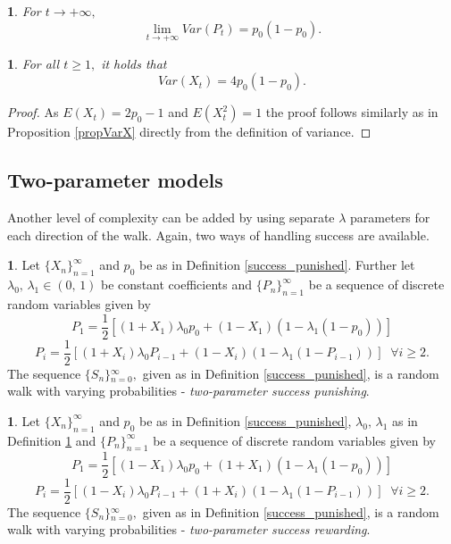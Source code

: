 \documentclass{amsart}
\theoremstyle{definition}
\newtheorem{defn}[thm]{\protect\definitionname}
\theoremstyle{plain}
\newtheorem{prop}[thm]{\protect\propositionname}
\theoremstyle{plain}
\newtheorem{cor}[thm]{\protect\corollaryname}
\theoremstyle{plain}
\numberwithin{equation}{section}
\providecommand{\corollaryname}{Corollary}
\providecommand{\definitionname}{Definition}
\providecommand{\propositionname}{Proposition}
\begin{document}
    \begin{cor}
        For $t\rightarrow+\infty,$ \textup{
            \[
                \lim_{t\to+\infty}Var(P_{t})=p_{0}(1-p_{0}).
            \]
        }
    \end{cor}

    \begin{prop}
        For all $t\geq1,$ it holds that
        \[
            Var(X_{t})=4p_0(1-p_0).
        \]
    \end{prop}
    \begin{proof}
        As $E(X_t)=2p_0-1$ and $E(X_t^2)=1$ the proof follows similarly as in Proposition \ref{propVarX} directly from the definition of variance.
    \end{proof}

    \subsection{Two-parameter models}

    Another level of complexity can be added by using separate $\lambda$
    parameters for each direction of the walk. Again, two ways of handling
    success are available.

    \begin{defn}
        \label{2lambdas}Let ${\{X_{n}\}}_{n=1}^{\infty}$ and $p_{0}$ be
        as in Definition \ref{success_punished}. Further let $\lambda_{0},\,\lambda_{1}\in(0,\,1)$
        be constant coefficients and ${\{P_{n}\}}_{n=1}^{\infty}$ be a sequence
        of discrete random variables given by
        \begin{equation}
            P_{1}=\frac{1}{2}[(1+X_{1})\lambda_{0}p_{0}+(1-X_{1})(1-\lambda_{1}(1-p_{0}))]\label{eq:P!1_def-1-1}
        \end{equation}
        \begin{equation}
            P_{i}=\frac{1}{2}[(1+X_{i})\lambda_{0}P_{i-1}+(1-X_{i})(1-\lambda_{1}(1-P_{i-1}))]\;\;\forall i\geq2.\label{eq:Pi_def-1-1}
        \end{equation}
        The sequence ${\{S_{n}\}}{}_{n=0}^{\infty},$ given as in Definition \ref{success_punished}, is a random walk with varying probabilities - \emph{two-parameter success
        punishing}.
    \end{defn}


    \begin{defn}
        \label{2lambdas-reward}Let ${\{X_{n}\}}_{n=1}^{\infty}$ and $p_{0}$
        be as in Definition \ref{success_punished}, $\lambda_{0},\,\lambda_{1}$
        as in Definition \ref{2lambdas} and ${\{P_{n}\}}_{n=1}^{\infty}$ be a sequence
        of discrete random variables given by
        \[
            P_{1}=\frac{1}{2}[(1-X_{1})\lambda_{0}p_{0}+(1+X_{1})(1-\lambda_{1}(1-p_{0}))]
        \]
        \[
            P_{i}=\frac{1}{2}[(1-X_{i})\lambda_{0}P_{i-1}+(1+X_{i})(1-\lambda_{1}(1-P_{i-1}))]\;\;\forall i\geq2.
        \]
        The sequence ${\{S_{n}\}}{}_{n=0}^{\infty},$ given as in Definition \ref{success_punished}, is a random walk with varying probabilities - \emph{two-parameter success
        rewarding}.
    \end{defn}
\end{document}

